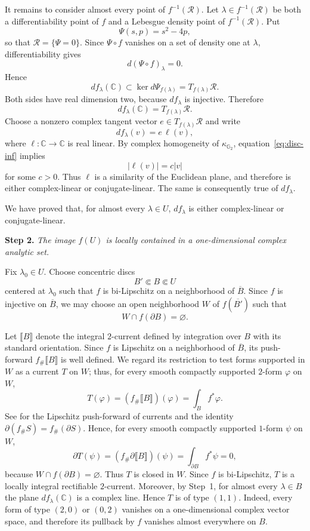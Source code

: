 \documentclass[12pt]{amsart}
\newcommand{\CC}{\mathbb C}
\newcommand{\GG}{\mathbb G_2}
\newcommand{\cR}{\mathcal R}
\begin{document}
It remains to consider almost every point of $f^{-1}(\cR)$.
Let $\lambda\in f^{-1}(\cR)$ be both a differentiability point of $f$
and a Lebesgue density point of $f^{-1}(\cR)$. Put
\[
 \Psi(s,p)=s^2-4p,
\]
so that $\cR=\{\Psi=0\}$. Since $\Psi\circ f$ vanishes on a set of
density one at $\lambda$, differentiability gives
\[
 d(\Psi\circ f)_\lambda=0.
\]
Hence
\[
 df_\lambda(\CC)
 \subset
 \ker d\Psi_{f(\lambda)}
 =
 T_{f(\lambda)}\cR.
\]
Both sides have real dimension two, because $df_\lambda$ is injective.
Therefore
\[
 df_\lambda(\CC)=T_{f(\lambda)}\cR.
\]
Choose a nonzero complex tangent vector $e\in T_{f(\lambda)}\cR$ and
write
\[
 df_\lambda(v)=e\,\ell(v),
\]
where $\ell:\CC\to\CC$ is real linear. By complex homogeneity of
$\kappa_{\GG}$, equation~\eqref{eq:disc-inf} implies
\[
 |\ell(v)|=c|v|
\]
for some $c>0$. Thus $\ell$ is a similarity of the Euclidean plane,
and therefore is either complex-linear or conjugate-linear. The same
is consequently true of $df_\lambda$.

We have proved that, for almost every $\lambda\in U$,
$df_\lambda$ is either complex-linear or conjugate-linear.

\medskip

\noindent
\textbf{Step 2.}
\emph{The image $f(U)$ is locally contained in a one-dimensional complex
analytic set.}

\medskip

Fix $\lambda_0\in U$. Choose concentric discs
\[
 B'\Subset B\Subset U
\]
centered at $\lambda_0$ such that $f$ is bi-Lipschitz on a neighborhood
of $\overline B$. Since $f$ is injective on $\overline B$, we may choose
an open neighborhood $W$ of $f(\overline{B'})$ such that
\[
 W\cap f(\partial B)=\varnothing.
\]

Let $\llbracket B\rrbracket$ denote the integral $2$-current defined by
integration over $B$ with its standard orientation. Since $f$ is Lipschitz on
a neighborhood of $\overline B$, its push-forward
$f_\#\llbracket B\rrbracket$ is well defined. We regard its restriction to
test forms supported in $W$ as a current $T$ on $W$; thus, for every smooth
compactly supported $2$-form $\varphi$ on $W$,
\[
 T(\varphi)
 =
 (f_\#\llbracket B\rrbracket)(\varphi)
 =
 \int_B f^*\varphi.
\]
See \cite[Section 4.1.14]{Federer1969} for the Lipschitz push-forward of currents and the identity
$\partial(f_\#S)=f_\#(\partial S)$. Hence, for every smooth compactly supported
$1$-form $\psi$ on $W$,
\[
 \partial T(\psi)
 =
 (f_\#\partial\llbracket B\rrbracket)(\psi)
 =
 \int_{\partial B} f^*\psi
 =0,
\]
because $W\cap f(\partial B)=\varnothing$. Thus $T$ is closed in $W$.
Since $f$ is bi-Lipschitz, $T$ is a locally integral rectifiable
$2$-current. Moreover, by Step~1, for almost every $\lambda\in B$
the plane $df_\lambda(\CC)$ is a complex line. Hence $T$ is of type
$(1,1)$. Indeed, every form of type $(2,0)$ or $(0,2)$ vanishes on a
one-dimensional complex vector space, and therefore its pullback by
$f$ vanishes almost everywhere on $B$.
\end{document}
